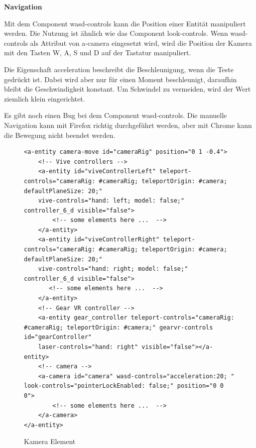   \vspace{1em}
  \noindent
  \textbf{Navigation}
  \vspace{1em}
  
  \noindent
  Mit dem Component {\selectfont wasd-controls} kann die Position einer Entität manipuliert werden. Die Nutzung ist ähnlich wie das Component {\selectfont look-controls}. Wenn {\selectfont wasd-controls} als Attribut von {\selectfont a-camera} eingesetzt wird, wird die Position der Kamera mit den Tasten W, A, S und D auf der Tastatur manipuliert.
  
  Die Eigenschaft {\selectfont acceleration} beschreibt die Beschleunigung, wenn die Teste gedrückt ist. Dabei wird aber nur für einen Moment beschleunigt, daraufhin bleibt die Geschwindigkeit konstant. Um Schwindel zu vermeiden, wird der Wert ziemlich klein eingerichtet.
  
  Es gibt noch einen Bug bei dem Component {\selectfont wasd-controls}. Die manuelle Navigation kann mit Firefox richtig durchgeführt werden, aber mit Chrome kann die Bewegung nicht beendet werden.
  
\begin{figure}[ht]
\vspace*{1em}
\centering
\caption[Kamera Element]{Kamera Element}
\begin{lstlisting}[language=HTML5, style=htmlcssjs]
<a-entity camera-move id="cameraRig" position="0 1 -0.4">
    <!-- Vive controllers -->
    <a-entity id="viveControllerLeft" teleport-controls="cameraRig: #cameraRig; teleportOrigin: #camera; defaultPlaneSize: 20;" 
    vive-controls="hand: left; model: false;" controller_6_d visible="false">
        <!-- some elements here ...  -->
    </a-entity>
    <a-entity id="viveControllerRight" teleport-controls="cameraRig: #cameraRig; teleportOrigin: #camera; defaultPlaneSize: 20;" 
    vive-controls="hand: right; model: false;" controller_6_d visible="false">
       <!-- some elements here ...  -->
    </a-entity>
    <!-- Gear VR controller -->
    <a-entity gear_controller teleport-controls="cameraRig: #cameraRig; teleportOrigin: #camera;" gearvr-controls id="gearController" 
    laser-controls="hand: right" visible="false"></a-entity>
    <!-- camera -->
    <a-camera id="camera" wasd-controls="acceleration:20; " look-controls="pointerLockEnabled: false;" position="0 0 0">
        <!-- some elements here ...  -->
    </a-camera>
</a-entity>
\end{lstlisting}
\label{fig:cameraHtml} 
\end{figure}
  
